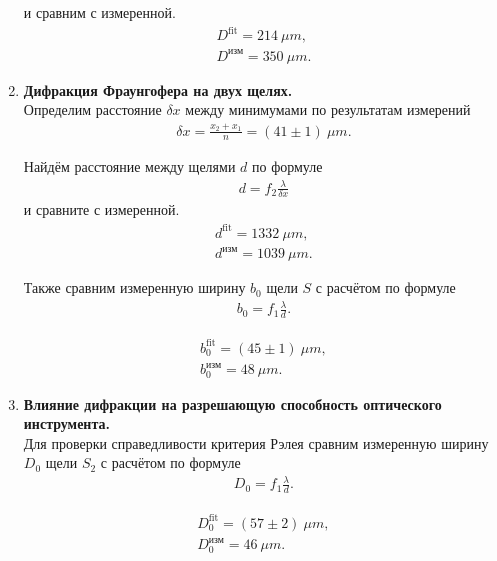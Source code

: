 \begin{enumerate}
    и сравним с измеренной.
    \begin{gather*}
        D^{\text{fit}} = 214~\mu m,\\
        D^{\text{изм}} = 350~\mu m.
    \end{gather*}
    
    \item 

    \textbf{Дифракция Фраунгофера на двух щелях.}\\
    
    Определим расстояние $\delta x$ между минимумами по результатам измерений
    \begin{gather*}
        \delta x = \frac{x_2 + x_1}{n} = (41 \pm 1)~\mu m.
    \end{gather*}
    
    Найдём расстояние между щелями $d$ по формуле
    \begin{gather*}
        d = f_2 \frac{\lambda}{\delta x}
    \end{gather*}
    и сравните с измеренной.
    \begin{gather*}
        d^{\text{fit}} = 1332~\mu m,\\
        d^{\text{изм}} = 1039~\mu m.
    \end{gather*}
    
    Также сравним измеренную ширину $b_0$ щели $S$ с расчётом по формуле
    \begin{gather*}
        b_0 = f_1 \frac{\lambda}{d}.
    \end{gather*}
    
    \begin{gather*}
        b_0^{\text{fit}} = (45 \pm 1)~\mu m,\\
        b_0^{\text{изм}} = 48~\mu m.
    \end{gather*}
    
    \item 
    
    \textbf{Влияние дифракции на разрешающую способность оптического инструмента.}\\
    
    Для проверки справедливости критерия Рэлея сравним измеренную ширину $D_0$ щели $S_2$ с расчётом по формуле
    \begin{gather*}
        D_0 = f_1 \frac{\lambda}{d}.
    \end{gather*}
    
    \begin{gather*}
        D_0^{\text{fit}} = (57 \pm 2)~\mu m,\\
        D_0^{\text{изм}} = 46~\mu m.
    \end{gather*}
    

\end{enumerate}


